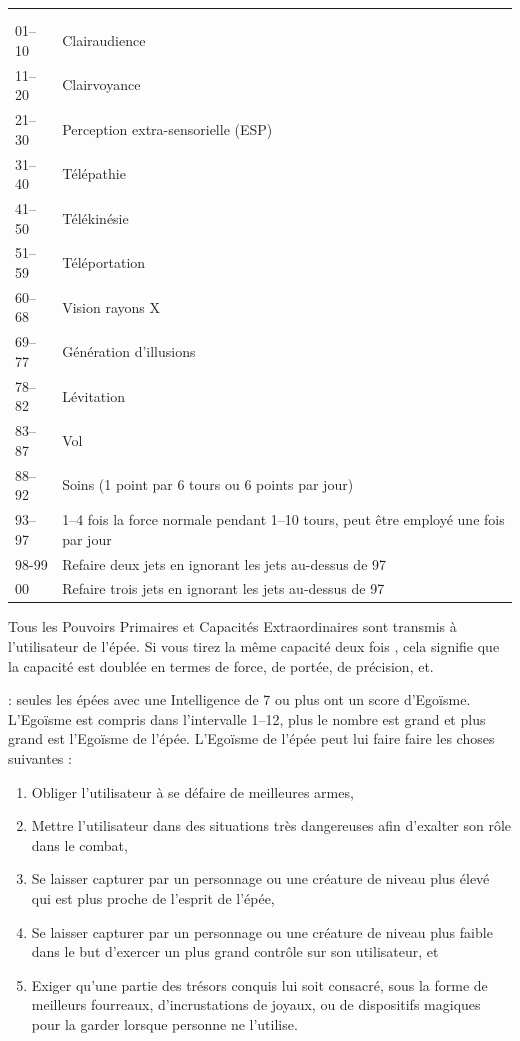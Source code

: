 \documentclass[11pt]{article}
\newcommand{\myunderline}[1]{\underline{\smash{#1}}}
\begin{document}
{{\begin{tabular}[t]{p{3cm}p{12cm}}
\multicolumn{2}{l}{\myunderline{\textbf{Table des Capacités Extraordinaires}}} \\
\textbf{\myunderline{Jet de dé}} & \myunderline{\textbf{Capacité}} \\
01--10 & Clairaudience \\
11--20 & Clairvoyance \\
21--30 & Perception extra-sensorielle (ESP) \\
31--40 & Télépathie \\
41--50 & Télékinésie \\
51--59 & Téléportation \\
60--68 & Vision rayons X \\
69--77 & Génération d'illusions \\
78--82 & Lévitation \\
83--87 & Vol \\
88--92 & Soins (1 point par 6 tours ou 6 points par jour) \\
93--97 & 1--4 fois la force normale pendant 1--10 tours, peut être employé une fois par jour \\
98-99 & Refaire deux jets en ignorant les jets au-dessus de 97 \\
\hspace{0.4cm}00 & Refaire trois jets en ignorant les jets au-dessus de 97 \\
\end{tabular}

\medskip

Tous les Pouvoirs Primaires et Capacités Extraordinaires sont transmis à l'utilisateur de l'épée. Si vous tirez la même capacité deux fois , cela signifie que la capacité est doublée en termes de force, de portée, de précision, et.

\bigskip

\myunderline{\textbf{Egoïsme}} : seules les épées avec une Intelligence de 7 ou plus ont un score d'Egoïsme. L'Egoïsme est compris dans l'intervalle 1--12, plus le nombre est grand et plus grand est l'Egoïsme de l'épée. L'Egoïsme de l'épée peut lui faire faire les choses suivantes :

\begin{enumerate}
\item Obliger l'utilisateur à se défaire de meilleures armes,
\item Mettre l'utilisateur dans des situations très dangereuses afin d'exalter son rôle dans le combat,
\item Se laisser capturer par un personnage ou une créature de niveau plus élevé qui est plus proche de l'esprit de l'épée,
\item Se laisser capturer par un personnage ou une créature de niveau plus faible dans le but d'exercer un plus grand contrôle sur son utilisateur, et
\item Exiger qu'une partie des trésors conquis lui soit consacré, sous la forme de meilleurs fourreaux, d'incrustations de joyaux, ou de dispositifs magiques pour la garder lorsque personne ne l'utilise.
\end{enumerate}

}}
\end{document}
